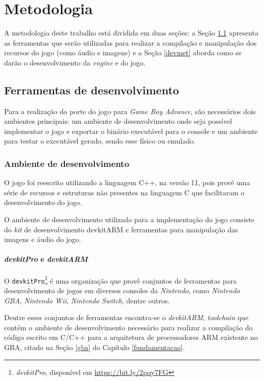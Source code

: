 \chapter[Metodologia]{Metodologia} \label{metodologia}

A metodologia deste trabalho está dividida em duas seções: a Seção \ref{devtools} apresenta as ferramentas que serão utilizadas para realizar a compilação e manipulação dos recursos do jogo (como áudio e imagens) e a Seção \ref{devmet} aborda como se darão o desenvolvimento da \textit{engine} e do jogo.

\section{Ferramentas de desenvolvimento} \label{devtools}

  Para a realização do porte do jogo para \textit{Game Boy Advance}, são necessários dois ambientes principais: um ambiente de desenvolvimento onde seja possível implementar o jogo e exportar o binário executável para o console e um ambiente para testar o executável gerado, sendo esse físico ou emulado.

  \subsection{Ambiente de desenvolvimento}

    O jogo foi reescrito utilizando a linguagem C++, na versão 11, pois provê uma série de recursos e estruturas não presentes na linguagem C que facilitaram o desenvolvimento do jogo.

    O ambiente de desenvolvimento utilizado para a implementação do jogo consiste do \textit{kit} de desenvolvimento devkitARM e ferramentas para manipulação das imagens e áudio do jogo.

    \subsubsection{\textit{devkitPro} e \textit{devkitARM}}

      O \texttt{devkitPro}\footnote{\textit{devkitPro}, disponível em \url{https://bit.ly/2pqy7FG}} é uma organização que provê conjuntos de ferramentas para desenvolvimento de jogos em diversos consoles da \textit{Nintendo}, como \textit{Nintendo GBA}, \textit{Nintendo Wii}, \textit{Nintendo Switch}, dentre outros.

      Dentre esses conjuntos de ferramentas encontra-se o \textit{devkitARM}, \textit{toolchain} que contém o ambiente de desenvolvimento necessário para realizar a compilação do código escrito em C/C++ para a arquitetura de processadores ARM existente no GBA, citado na Seção \ref{gba} do Capítulo \ref{fundamentacao}.

